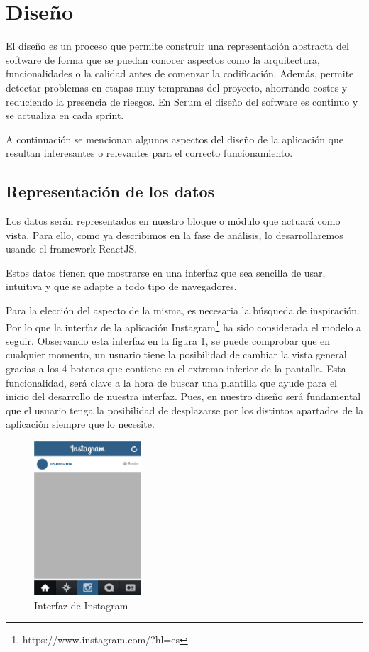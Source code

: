 \section{Diseño}

El diseño es un proceso que permite construir una representación abstracta del software de forma que se puedan conocer aspectos como la arquitectura, funcionalidades o la calidad antes de comenzar la codificación. Además, permite detectar problemas en etapas muy tempranas del proyecto, ahorrando costes y reduciendo la presencia de riesgos. En Scrum el diseño del software es continuo y se actualiza en cada sprint.

A continuación se mencionan algunos aspectos del diseño de la aplicación que resultan interesantes o relevantes para el correcto funcionamiento.

\subsection{Representación de los datos}

Los datos serán representados en nuestro bloque o módulo que actuará como vista. Para ello, como ya describimos en la fase de análisis, lo desarrollaremos usando el framework ReactJS.

Estos datos tienen que mostrarse en una interfaz que sea sencilla de usar, intuitiva y que se adapte a todo tipo de navegadores. 

Para la elección del aspecto de la misma, es necesaria la búsqueda de inspiración. Por lo que la interfaz de la aplicación Instagram\footnote{https://www.instagram.com/?hl=es} ha sido considerada el modelo a seguir. Observando esta interfaz en la figura \ref{fig::insta}, se puede comprobar que en cualquier momento, un usuario tiene la posibilidad de cambiar la vista general gracias a los 4 botones que contiene en el extremo inferior de la pantalla. Esta funcionalidad, será clave a la hora de buscar una plantilla que ayude para el inicio del desarrollo de nuestra interfaz. Pues, en nuestro diseño será fundamental que el usuario tenga la posibilidad de desplazarse por los distintos apartados de la aplicación siempre que lo necesite.

\begin{figure}[htbp]
    \centerline{\includegraphics[width=4cm]{figuras/insta.jpg}}
    \caption{Interfaz de Instagram}
    \label{fig::insta}
\end{figure}

